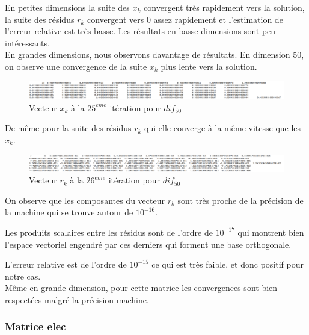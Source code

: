\documentclass[12,french]{report}
\begin{document}
En petites dimensions la suite des $x_{k}$ convergent très rapidement vers la solution, la suite des résidus $r_{k}$ convergent vers 0 assez rapidement et l'estimation de l'erreur relative est très basse. Les résultats en basse dimensions sont peu intéressants.\\

En grandes dimensions, nous observons davantage de résultats. En dimension 50, on observe une convergence de la suite $x_{k}$ plus lente vers la solution. \\

\begin{figure}[htb!]
	\centering
	\includegraphics[width=1\textwidth]{./Images/x_dif_50}
	\caption{Vecteur $x_{k}$ à la $25^{eme}$ itération pour $dif_{50}$}
\end{figure}\vspace{0.2cm}

De même pour la suite des résidus $r_{k}$ qui elle converge à la même vitesse que les $x_{k}$. \\

\begin{figure}[htb!]
	\centering
	\includegraphics[width=1\textwidth]{./Images/r_dif_50}
	\caption{Vecteur $r_{k}$ à la $26^{eme}$ itération pour $dif_{50}$}
\end{figure}\vspace{0.2cm}

On observe que les composantes du vecteur $r_{k}$ sont très proche de la précision de la machine qui se trouve autour de $10^{-16}$.

Les produits scalaires entre les résidus sont de l'ordre de $10^{-17}$ qui montrent bien l'espace vectoriel engendré par ces derniers qui forment une base orthogonale.

L'erreur relative est de l'ordre de $10^{-15}$ ce qui est très faible, et donc positif pour notre cas.\\

Même en grande dimension, pour cette matrice les convergences sont bien respectées malgré la précision machine.

\subsubsection{Matrice elec}
\end{document}
